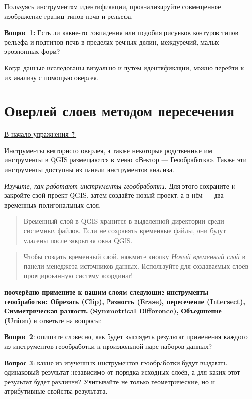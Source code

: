 \documentclass[
  12pt,
]{book}
\begin{document}
\begin{enumerate}
  Пользуясь инструментом идентификации, проанализируйте совмещенное изображение границ типов почв и рельефа.
\end{enumerate}

\textbf{Вопрос 1:} Есть ли какие-то совпадения или подобия рисунков контуров типов рельефа и подтипов почв в пределах речных долин, междуречий, малых эрозионных форм?

Когда данные исследованы визуально и путем идентификации, можно перейти к их анализу с помощью оверлея.

\hypertarget{overlay-intersect}{%
\section{Оверлей слоев методом пересечения}\label{overlay-intersect}}

\protect\hyperlink{overlay}{В начало упражнения ⇡}

Инструменты векторного оверлея, а также некоторые родственные им инструменты в QGIS размещаются в меню «Вектор --- Геообработка». Также эти инструменты доступны из панели инструментов анализа.

\emph{Изучите, как работают инструменты геообработки}. Для этого сохраните и закройте свой проект QGIS, затем создайте новый проект, а в нём --- два временных полигональных слоя.

\begin{quote}
Временный слой в QGIS хранится в выделенной директории среди системных файлов. Если не сохранять временные файлы, они будут удалены после закрытия окна QGIS.
\end{quote}

\begin{quote}
Чтобы создать временный слой, нажмите кнопку \emph{Новый временный слой} в панели менеджера источников данных. Используйте для создаваемых слоёв проецированную систему координат!
\end{quote}

\textbf{поочерёдно примените к вашим слоям следующие инструменты геообработки: Обрезать (Clip), Разность (Erase), пересечение (Intersect), Симметрическая разность (Symmetrical Difference), Объединение (Union)} и ответьте на вопросы:

\textbf{Вопрос 2}: опишите словесно, как будет выглядеть результат применения каждого из инструментов геообработки к произвольной паре наборов данных?

\textbf{Вопрос 3}: какие из изученных инструментов геообработки будут выдавать одинаковый результат независимо от порядка исходных слоёв, а для каких этот результат будет различен? Учитывайте не только геометрические, но и атрибутивные свойства результата.
\end{document}
